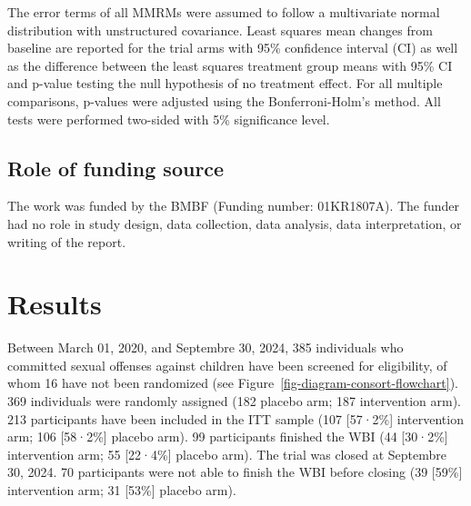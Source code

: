 \documentclass[
  super,
  preprint,
  1p,
  onecolumn]{elsarticle}
\begin{document}
The error terms of all MMRMs were assumed to follow a multivariate
normal distribution with unstructured covariance. Least squares mean
changes from baseline are reported for the trial arms with 95\%
confidence interval (CI) as well as the difference between the least
squares treatment group means with 95\% CI and p-value testing the null
hypothesis of no treatment effect. For all multiple comparisons,
p-values were adjusted using the Bonferroni-Holm's method. All tests
were performed two-sided with 5\% significance level.

\subsection{Role of funding source}\label{role-of-funding-source}

The work was funded by the BMBF (Funding number: 01KR1807A). The funder
had no role in study design, data collection, data analysis, data
interpretation, or writing of the report.

\section{Results}\label{results}

Between March 01, 2020, and Septembre 30, 2024, 385 individuals who
committed sexual offenses against children have been screened for
eligibility, of whom 16 have not been randomized (see
Figure~\ref{fig-diagram-consort-flowchart}). 369 individuals were
randomly assigned (182 placebo arm; 187 intervention arm). 213
participants have been included in the ITT sample (107 {[}57·2\%{]}
intervention arm; 106 {[}58·2\%{]} placebo arm). 99 participants
finished the WBI (44 {[}30·2\%{]} intervention arm; 55 {[}22·4\%{]}
placebo arm). The trial was closed at Septembre 30, 2024. 70
participants were not able to finish the WBI before closing (39
{[}59\%{]} intervention arm; 31 {[}53\%{]} placebo arm).
\end{document}
